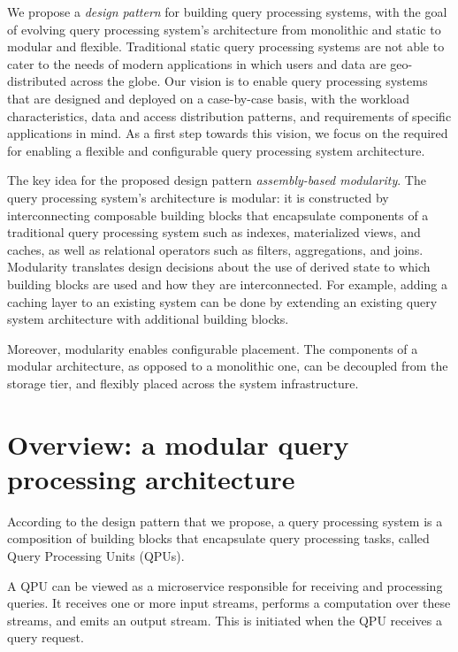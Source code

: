 
We propose a \textit{design pattern} for building query processing systems,
with the goal of evolving query processing system's architecture from monolithic and static to modular and flexible.
Traditional static query processing systems are not able to cater to the needs of modern applications in which users and
data are geo-distributed across the globe.
Our vision is to enable query processing systems that are designed and deployed on a case-by-case basis,
with the workload characteristics, data and access distribution patterns, and requirements of specific applications in
mind.
As a first step towards this vision, we focus on the  required for enabling a flexible and configurable
query processing system architecture.

\medskip

The key idea for the proposed design pattern \textit{assembly-based modularity}.
The query processing system's architecture is modular:
it is constructed by interconnecting composable building blocks
that encapsulate components of a traditional query processing system such as indexes, materialized views,
and caches, as well as relational operators such as filters, aggregations, and joins.
Modularity translates design decisions about the use of derived state to which building blocks are used and how they are
interconnected.
For example, adding a caching layer to an existing system can be done by extending an existing query system architecture
with additional building blocks.

Moreover, modularity enables configurable placement.
The components of a modular architecture, as opposed to a monolithic one,
can be decoupled from the storage tier, and flexibly placed across the system infrastructure.


\section{Overview: a modular query processing architecture}

According to the design pattern that we propose,
a query processing system is a composition of building blocks that encapsulate query processing tasks, called
Query Processing Units (QPUs).

A QPU can be viewed as a microservice responsible for receiving and processing queries.
It receives one or more input streams, performs a computation over these streams, and emits an output stream.
This is initiated when the QPU receives a query request.

